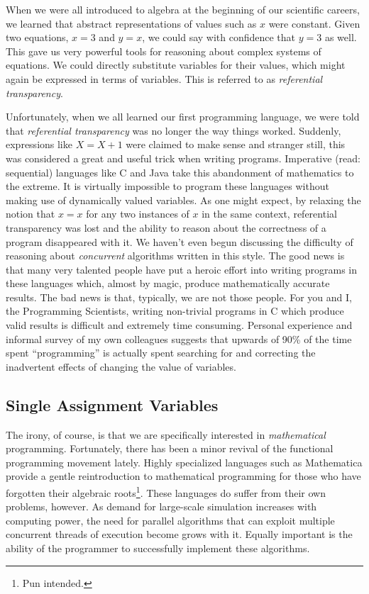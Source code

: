 \documentclass[twocolumn,a4paper,10pt]{article}
\begin{document}
When we were all introduced to algebra at the beginning of our scientific
careers, we learned that abstract representations of values such as $x$ were
constant. Given two equations, $x = 3$ and $y = x$, we could say with confidence
that $y = 3$ as well. This gave us very powerful tools for reasoning about
complex systems of equations. We could directly substitute variables for their
values, which might again be expressed in terms of variables. This is referred
to as \emph{referential transparency}.

Unfortunately, when we all learned our first programming language, we were told
that \emph{referential transparency} was no longer the way things worked.
Suddenly, expressions like $X = X + 1$ were claimed to make sense and stranger
still, this was considered a great and useful trick when writing programs.
Imperative (read: sequential) languages like C and Java take this abandonment of
mathematics to the extreme. It is virtually impossible to program these
languages without making use of dynamically valued variables. As one might
expect, by relaxing the notion that $x = x$ for any two instances of $x$ in the
same context, referential transparency was lost and the ability to reason about
the correctness of a program disappeared with it. We haven't even begun
discussing the difficulty of reasoning about \emph{concurrent} algorithms
written in this style. The good news is that many very talented people have put
a heroic effort into writing programs in these languages which, almost by magic,
produce mathematically accurate results. The bad news is that, typically, we are
not those people. For you and I, the Programming Scientists, writing non-trivial
programs in C which produce valid results is difficult and extremely time
consuming. Personal experience and informal survey of my own colleagues suggests
that upwards of 90\% of the time spent ``programming'' is actually spent
searching for and correcting the inadvertent effects of changing the value of
variables.

\subsection{Single Assignment Variables}

The irony, of course, is that we are specifically interested in
\emph{mathematical} programming. Fortunately, there has been a minor revival of
the functional programming movement lately. Highly specialized languages such as
Mathematica provide a gentle reintroduction to mathematical programming for
those who have forgotten their algebraic roots\footnote{Pun intended.}. These
languages do suffer from their own problems, however. As demand for large-scale
simulation increases with computing power, the need for parallel algorithms that
can exploit multiple concurrent threads of execution become grows with it.
Equally important is the ability of the programmer to successfully implement
these algorithms.
\end{document}
